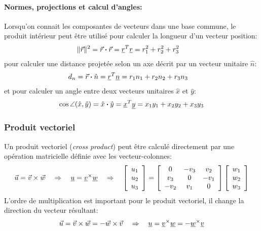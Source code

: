 \paragraph{Normes, projections et calcul d'angles:}
Lorsqu'on connait les composantes de vecteurs dans une base commune, le produit intérieur peut être utilisé pour calculer la longueur d'un vecteur position:
\begin{align}
\|\vec{r}\|^2 &= \vec{r} \boldsymbol{\cdot} \vec{r} = \underline{r}^T \underline{r} = r_1^2 + r_2^2 + r_3^2
\end{align} 
pour calculer une distance projetée selon un axe décrit par un vecteur unitaire $\hat{n}$:
\begin{align}
d_n &= \vec{r} \boldsymbol{\cdot} \hat{n} = \underline{r}^T \underline{n} = r_1 n_1 + r_2 n_2 + r_3 n_3
\end{align} 
et pour calculer un angle entre deux vecteurs unitaires $\hat{x}$ et $\hat{y}$:
\begin{align}
\cos \angle (\hat{x},\hat{y}) = \hat{x} \boldsymbol{\cdot} \hat{y} = \underline{x}^T \underline{y} = x_1 y_1 + x_2 y_2 + x_3 y_3
\end{align} 

\subsubsection{Produit vectoriel}
%
Un produit vectoriel (\textit{cross product}) peut être calculé directement par une opération matricielle définie avec les vecteur-colonnes:
\begin{equation}
\vec{u} = \vec{v} \times \vec{w} \quad \Rightarrow \quad  \underline{u} = \underline{v}^{\times}\underline{w} \quad \Rightarrow \quad 
 \left[ \begin{array}{c} u_1 \\ u_2 \\ u_3  \end{array} \right] = 
\left[ \begin{array}{c c c}
	0 & -v_3 & v_2  \\ v_3 & 0 & -v_1 \\ -v_2 & v_1 & 0
\end{array}  \right]
 \left[ \begin{array}{c} w_1 \\ w_2 \\ w_3  \end{array} \right]
\end{equation} 
L'ordre de multiplication est important pour le produit vectoriel, il change la direction du vecteur résultant:
\begin{equation}
\vec{u} = \vec{v} \times \vec{w} =  -\vec{w} \times \vec{v} \quad \Rightarrow \quad  \underline{u} = \underline{v}^{\times}\underline{w} = - \underline{w}^{\times}\underline{v}
\end{equation} 

